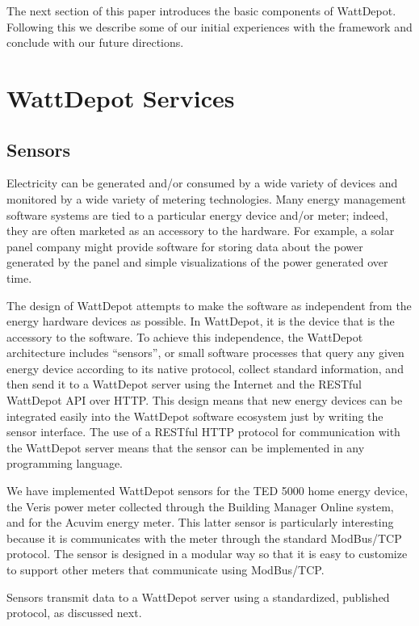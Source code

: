 \documentclass[conference]{IEEEtran}
\begin{document}
The next section of this paper introduces the basic components of
WattDepot. Following this we describe some of our initial experiences with
the framework and conclude with our future directions. 

\section{WattDepot Services}

\subsection{Sensors}

Electricity can be generated and/or consumed by a wide variety of devices
and monitored by a wide variety of metering technologies.  Many energy
management software systems are tied to a particular energy device and/or
meter; indeed, they are often marketed as an accessory to the hardware.  For
example, a solar panel company might provide software for storing data
about the power generated by the panel and simple visualizations of the
power generated over time.

The design of WattDepot attempts to make the software as independent from
the energy hardware devices as possible.  In WattDepot, it is the device
that is the accessory to the software.  To achieve this independence, the
WattDepot architecture includes ``sensors'', or small software processes
that query any given energy device according to its native protocol,
collect standard information, and then send it to a WattDepot server using
the Internet and the RESTful WattDepot API over HTTP.  This design means
that new energy devices can be integrated easily into the WattDepot
software ecosystem just by writing the sensor interface.  The use of a
RESTful HTTP protocol for communication with the WattDepot server means
that the sensor can be implemented in any programming language.

We have implemented WattDepot sensors for the TED 5000 home energy device, 
the Veris power meter collected through the Building Manager Online system,
and for the Acuvim energy meter. This latter sensor is particularly
interesting because it is communicates with the meter through the standard
ModBus/TCP protocol. The sensor is designed in a modular way so that it is
easy to customize to support other meters that communicate using ModBus/TCP.

Sensors transmit data to a WattDepot server using a standardized, published
protocol, as discussed next.
\end{document}
